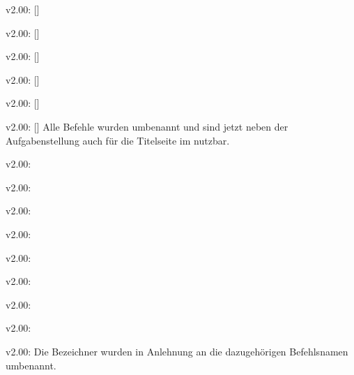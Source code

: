 \begin{Entity}{}
\begin{Obsolete}{v2.00:}
  {[]}
\begin{Obsolete}{v2.00:}
  {[]}
\begin{Obsolete}{v2.00:}
  {[]}
\begin{Obsolete}{v2.00:}
  {[]}
\begin{Obsolete}{v2.00:}
  {[]}
\begin{Obsolete}{v2.00:}
  {[]}
\printobsoletelist%
%
Alle Befehle wurden umbenannt und sind jetzt neben der Aufgabenstellung auch 
für die Titelseite im \CD nutzbar.
\end{Obsolete}
\end{Obsolete}
\end{Obsolete}
\end{Obsolete}
\end{Obsolete}
\end{Obsolete}

\begin{Obsolete}{v2.00:}
  {}
\begin{Obsolete}{v2.00:}
  {}
\begin{Obsolete}{v2.00:}
  {}
\begin{Obsolete}{v2.00:}
  {}
\begin{Obsolete}{v2.00:}
  {}
\begin{Obsolete}{v2.00:}
  {}
\begin{Obsolete}{v2.00:}
  {}
\begin{Obsolete}{v2.00:}
  {}
\begin{Obsolete}{v2.00:}
  {}
\printobsoletelist%
%
Die Bezeichner wurden in Anlehnung an die dazugehörigen Befehlsnamen umbenannt.
\end{Obsolete}
\end{Obsolete}
\end{Obsolete}
\end{Obsolete}
\end{Obsolete}
\end{Obsolete}
\end{Obsolete}
\end{Obsolete}
\end{Obsolete}
\end{Entity}



